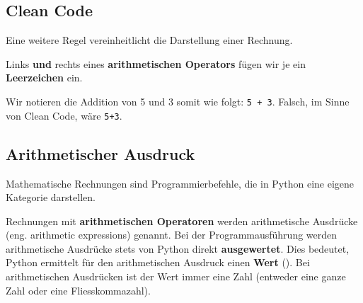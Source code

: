 \subsection{Clean Code}

Eine weitere Regel vereinheitlicht die Darstellung einer Rechnung.

\begin{cleancode}[Leerzeichen 4]
Links \textbf{und} rechts eines \textbf{arithmetischen Operators} fügen wir je ein \textbf{Leerzeichen} ein.
\end{cleancode}

\begin{example}
Wir notieren die Addition von \num{5} und \num{3} somit wie folgt: \lstinline{5 + 3}. Falsch, im Sinne von Clean Code, wäre \lstinline{5+3}.
\end{example}

\newpage

\subsection{Arithmetischer Ausdruck}

Mathematische Rechnungen sind Programmierbefehle, die in Python eine eigene Kategorie darstellen.

\begin{definition}
	Rechnungen mit \textbf{arithmetischen Operatoren} werden arithmetische Ausdrücke (eng. arithmetic expressions) genannt. Bei der Programmausführung werden arithmetische Ausdrücke stets von Python direkt \textbf{ausgewertet}. Dies bedeutet, Python ermittelt für den arithmetischen Ausdruck einen \textbf{Wert} (). Bei arithmetischen Ausdrücken ist der Wert immer eine Zahl (entweder eine ganze Zahl oder eine Fliesskommazahl). 
\end{definition}


